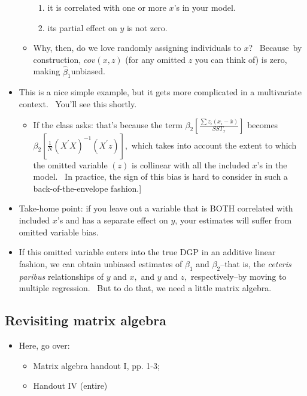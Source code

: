 \documentclass[11pt]{article}
\begin{document}
\begin{itemize}
\begin{itemize}
\begin{enumerate}
\item it is correlated with one or more $x$'s in your model.

\item its partial effect on $y$ is not zero.
\end{enumerate}

\item Why, then, do we love randomly assigning individuals to $x$? \
Because\ by construction, $cov(x,z)$ (for any omitted $z$ you can think of)
is zero, making $\widehat{\beta }_{1}$unbiased.
\end{itemize}

\item This is a nice simple example, but it gets more complicated in a
multivariate context. \ You'll see this shortly. \ 

\begin{itemize}
\item \lbrack If the class asks: that's because the term $\beta _{2}\left[ 
\frac{\sum z_{i}\left( x_{i}-\overline{x}\right) }{SST_{x}}\right] $ becomes 
$\beta _{2}\left[ \frac{1}{N}\left( X^{\prime }X\right) ^{-1}\left(
X^{\prime }z\right) \right] ,$ which takes into account the extent to which
the omitted variable $\left( z\right) $ is collinear with all the included $%
x $'s in the model. \ In practice, the sign of this bias is hard to consider
in such a back-of-the-envelope fashion.]
\end{itemize}

\item Take-home point: if you leave out a variable that is BOTH correlated
with included $x$'s and has a separate effect on $y$, your estimates will
suffer from omitted variable bias. \ 

\item If this omitted variable enters into the true DGP in an additive
linear fashion, we can obtain unbiased estimates of $\beta _{1}$ and $\beta
_{2}$--that is, the \textit{ceteris paribus} relationships of $y$ and $x,$
and $y$ and $z,$ respectively--by moving to multiple regression. \ But to do
that, we need a little matrix algebra.\bigskip
\end{itemize}

\subsection{Revisiting matrix algebra}

\begin{itemize}
\item Here, go over:

\begin{itemize}
\item Matrix algebra handout I, pp. 1-3;

\item Handout IV (entire)
\end{itemize}
\end{itemize}
\end{document}

